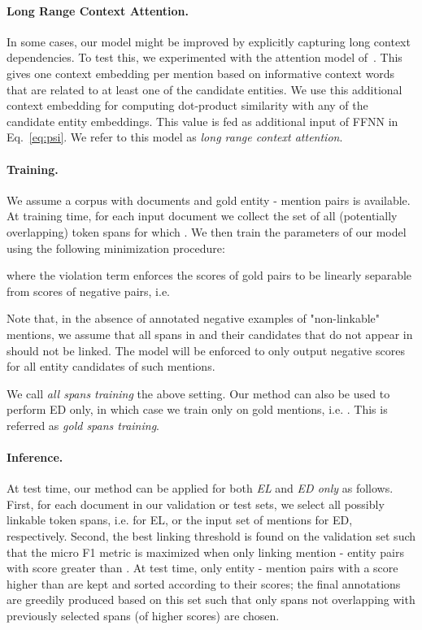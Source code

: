 \documentclass[11pt,a4paper]{article}
\begin{document}
\paragraph{Long Range Context Attention.}
In some cases, our model might be improved by explicitly capturing long context dependencies. To test this, we experimented with the attention model of~\citep{ganea2017deep}. This gives one context embedding per mention based on informative context words that are related to at least one of the candidate entities. We use this additional context embedding for computing dot-product similarity with any of the candidate entity embeddings. This value is fed as additional input of FFNN in Eq.~\ref{eq:psi}. We refer to this model as \textit{long range context attention}.


\paragraph{Training.}
We assume a corpus with documents and gold entity - mention pairs  is available. At training time, for each input document we collect the set  of all (potentially overlapping) token spans  for which . We then train the parameters of our model using the following minimization procedure:

where the violation term  enforces the scores of gold pairs to be linearly separable from scores of negative pairs, i.e.

Note that, in the absence of annotated negative examples of "non-linkable" mentions, we assume that all spans in  and their candidates that do not appear in  should not be linked. The model will be enforced to only output negative scores for all entity candidates of such mentions. 

We call \textit{all spans training} the above setting. Our method can also be used to perform ED only, in which case we train only on gold mentions, i.e. . This is referred as \textit{gold spans training}. 

\paragraph{Inference.} At test time, our method can be applied for both \textit{EL} and \textit{ED only} as follows. First, for each document in our validation or test sets, we select all possibly linkable token spans, i.e.  for EL, or the input set of mentions  for ED, respectively. Second, the best linking threshold  is found on the validation set such that the micro F1 metric is  maximized when only linking mention - entity pairs with  score greater than . At test time, only entity - mention pairs with a score higher than  are kept and sorted according to their  scores; the final annotations are greedily produced based on this set such that only spans not overlapping with previously selected spans (of higher scores) are chosen.
\end{document}

